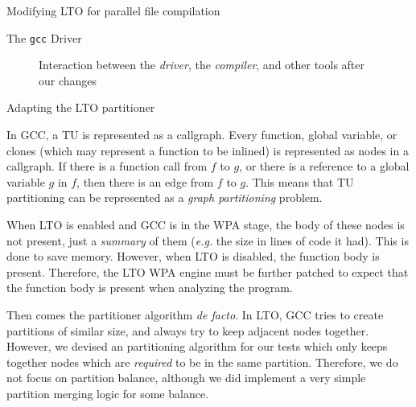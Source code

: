 \begin{section}{Modifying LTO for parallel file compilation}
\begin{subsection}{The \texttt{gcc} Driver}
\begin{figure}
{{
}
}%
\caption{Interaction between the \textit{driver}, the \textit{compiler}, and other tools
after our changes}
\label{fig:gnu_toolchain_patched}
\end{figure}

\end{subsection}

\begin{subsection}{Adapting the LTO partitioner}\label{sec:lto_partitioner}

In GCC, a TU is represented as a callgraph. Every function, global variable, or
clones (which may represent a function to be inlined) is represented as nodes
in a callgraph. If there is a function call from $f$ to $g$, or there is a
reference to a global variable $g$ in $f$, then there is an edge from $f$ to
$g$. This means that TU partitioning can be represented as a \emph{graph
partitioning} problem.

When LTO is enabled and GCC is in the WPA stage, the body of these nodes
is not present, just a \textit{summary} of them (\textit{e.g.} the size
in lines of code it had). This is done to save memory. However,
when LTO is disabled, the function body is present. Therefore,
the LTO WPA engine must be further patched to expect that the function
body is present when analyzing the program. 

Then comes the partitioner algorithm \textit{de facto}. In LTO, GCC tries to
create partitions of similar size, and always try to keep adjacent nodes together.
However, we devised an partitioning algorithm for our tests which only keeps
together nodes which are \textit{required} to be in the same partition. Therefore,
we do not focus on partition balance, although we did implement a very simple
partition merging logic for some balance.


\end{subsection}
\end{section}
